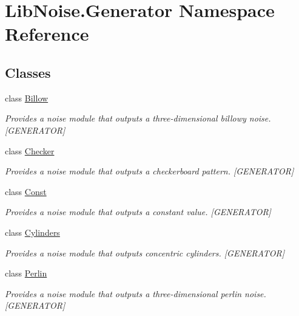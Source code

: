 \hypertarget{namespace_lib_noise_1_1_generator}{}\section{Lib\+Noise.\+Generator Namespace Reference}
\label{namespace_lib_noise_1_1_generator}
\subsection*{Classes}
\begin{DoxyCompactItemize}
\item 
class \hyperlink{class_lib_noise_1_1_generator_1_1_billow}{Billow}
\begin{DoxyCompactList}\small\item\em Provides a noise module that outputs a three-\/dimensional billowy noise. \mbox{[}G\+E\+N\+E\+R\+A\+T\+OR\mbox{]} \end{DoxyCompactList}\item 
class \hyperlink{class_lib_noise_1_1_generator_1_1_checker}{Checker}
\begin{DoxyCompactList}\small\item\em Provides a noise module that outputs a checkerboard pattern. \mbox{[}G\+E\+N\+E\+R\+A\+T\+OR\mbox{]} \end{DoxyCompactList}\item 
class \hyperlink{class_lib_noise_1_1_generator_1_1_const}{Const}
\begin{DoxyCompactList}\small\item\em Provides a noise module that outputs a constant value. \mbox{[}G\+E\+N\+E\+R\+A\+T\+OR\mbox{]} \end{DoxyCompactList}\item 
class \hyperlink{class_lib_noise_1_1_generator_1_1_cylinders}{Cylinders}
\begin{DoxyCompactList}\small\item\em Provides a noise module that outputs concentric cylinders. \mbox{[}G\+E\+N\+E\+R\+A\+T\+OR\mbox{]} \end{DoxyCompactList}\item 
class \hyperlink{class_lib_noise_1_1_generator_1_1_perlin}{Perlin}
\begin{DoxyCompactList}\small\item\em Provides a noise module that outputs a three-\/dimensional perlin noise. \mbox{[}G\+E\+N\+E\+R\+A\+T\+OR\mbox{]} \end{DoxyCompactList}\item 

\end{DoxyCompactItemize}
